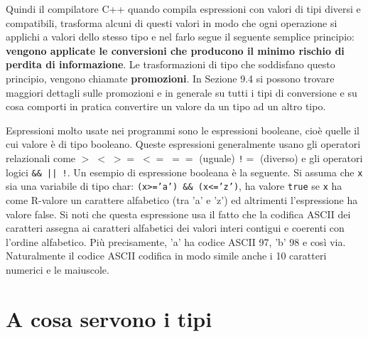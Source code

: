 Quindi il compilatore C++ quando compila espressioni con valori di tipi diversi e compatibili, trasforma alcuni di questi valori in modo che ogni operazione si applichi a valori dello stesso tipo e nel farlo segue il seguente semplice principio: \textbf{vengono applicate le conversioni che producono il minimo rischio di perdita di informazione}.
Le trasformazioni di tipo che soddisfano questo principio, vengono chiamate \textbf{promozioni}.
In Sezione 9.4 si possono trovare maggiori dettagli sulle promozioni e in generale su tutti i tipi di conversione e su cosa comporti in pratica convertire un valore da un tipo ad un altro tipo. 

Espressioni molto usate nei programmi sono le espressioni booleane, cioè quelle il cui valore è di tipo booleano.
Queste espressioni generalmente usano gli operatori relazionali come \texttt{$> \; < \; >= \; <= \; ==$} (uguale) \texttt{!$=$} (diverso) e gli operatori logici \texttt{\&\& || !}.
Un esempio di espressione booleana è la seguente.
Si assuma che \texttt{x} sia una variabile di tipo char: \texttt{(x>='a') \&\& (x<='z')}, ha valore \texttt{true} se \texttt{x} ha come R-valore un carattere alfabetico (tra 'a' e 'z') ed altrimenti l'espressione ha valore false.
Si noti che questa espressione usa il fatto che la codifica ASCII dei caratteri assegna ai caratteri alfabetici dei valori interi contigui e coerenti con l'ordine alfabetico.
Più precisamente, 'a' ha codice ASCII 97, 'b' 98 e così via.
Naturalmente il codice ASCII codifica in modo simile anche i 10 caratteri numerici e le maiuscole. 

\section{A cosa servono i tipi}

\newpage